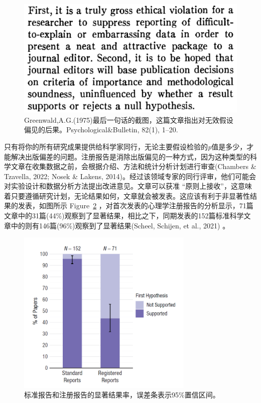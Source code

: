 \documentclass[
  letterpaper,
  DIV=11,
  numbers=noendperiod]{scrreprt}
\begin{document}
\begin{figure}

{\centering \includegraphics[width=1\textwidth,height=\textheight]{images/greenwald.png}

}

\caption{\label{fig-greenwald}Greenwald,A.G.(1975)最后一句话的截图，这篇文章指出对无效假设偏见的后果。Psychological\&Bulletin,
82(1), 1--20.}

\end{figure}

只有将你的所有研究成果提供给科学家同行，无论主要假设检验的\emph{p}值是多少，才能解决出版偏差的问题。注册报告是消除出版偏见的一种方式，因为这种类型的科学文章在收集数据之前，会根据介绍、方法和统计分析计划进行审查(Chambers
\& Tzavella, 2022; Nosek \& Lakens,
2014)。经过该领域专家的同行评审，他们可能会对实验设计和数据分析方法提出改进意见。文章可以获准
``原则上接收''，这意味着只要遵循研究计划，无论结果如何，文章就会被发表。这应该有利于非显著性结果的发表，如图所示
Figure~\ref{fig-scheel}
，对首次发表的心理学注册报告的分析显示，71篇文章中的31篇(44\%)观察到了显著结果，相比之下，同期发表的152篇标准科学文章中的则有146篇(96\%)观察到了显著结果(Scheel,
Schijen, et al., 2021) 。

\begin{figure}

{\centering \includegraphics[width=0.75\textwidth,height=\textheight]{images/scheel.png}

}

\caption{\label{fig-scheel}标准报告和注册报告的显著结果率，误差条表示95\%置信区间。}

\end{figure}
\end{document}
